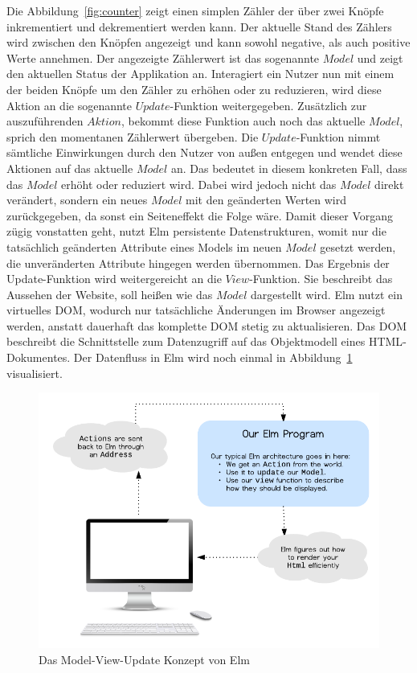 Die Abbildung~\ref{fig:counter} zeigt einen simplen Zähler der über zwei Knöpfe inkrementiert und dekrementiert werden kann. Der aktuelle Stand des Zählers wird zwischen den Knöpfen angezeigt und kann sowohl negative, als auch positive Werte annehmen.
Der angezeigte Zählerwert ist das sogenannte $Model$ und zeigt den aktuellen Status der Applikation an. Interagiert ein Nutzer nun mit einem der beiden Knöpfe um den Zähler zu erhöhen oder zu reduzieren, wird diese Aktion an die sogenannte $Update$-Funktion weitergegeben. Zusätzlich zur auszuführenden $Aktion$, bekommt diese Funktion auch noch das aktuelle $Model$, sprich den momentanen Zählerwert übergeben.
Die $Update$-Funktion nimmt sämtliche Einwirkungen durch den Nutzer von außen entgegen und wendet diese Aktionen auf das aktuelle $Model$ an. Das bedeutet in diesem konkreten Fall, dass das $Model$ erhöht oder reduziert wird. Dabei wird jedoch nicht das $Model$ direkt verändert, sondern ein neues $Model$ mit den geänderten Werten wird zurückgegeben, da sonst ein Seiteneffekt die Folge wäre. Damit dieser Vorgang zügig vonstatten geht, nutzt Elm persistente Datenstrukturen, womit nur die tatsächlich geänderten Attribute eines Models im neuen $Model$ gesetzt werden, die unveränderten Attribute hingegen werden übernommen.
Das Ergebnis der Update-Funktion wird weitergereicht an die $View$-Funktion. Sie beschreibt das Aussehen der Website, soll heißen wie das $Model$ dargestellt wird. Elm nutzt ein virtuelles \ac{DOM}, wodurch nur tatsächliche Änderungen im Browser angezeigt werden, anstatt dauerhaft das komplette \ac{DOM} stetig zu aktualisieren. Das \ac{DOM} beschreibt die Schnittstelle zum Datenzugriff auf das Objektmodell eines \ac{HTML}-Dokumentes.
Der Datenfluss in Elm wird noch einmal in Abbildung~\ref{fig:elm-model-view-update-concept} visualisiert.
\begin{figure}[h]
  \centering  
  \includegraphics[scale=1]{img/elm-model-view-update-concept.png}
  \caption{Das Model-View-Update Konzept von Elm}\label{fig:elm-model-view-update-concept}
\end{figure}

